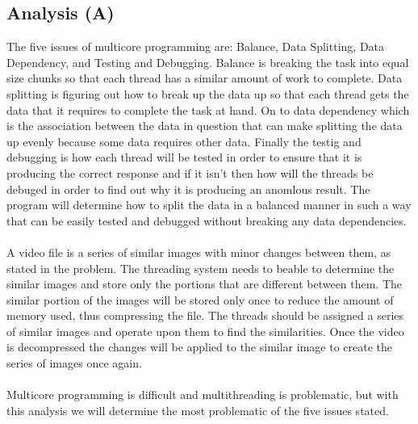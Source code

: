 \documentclass[12pt]{article}
\begin{document}
        \subsection{Analysis (A)}
        The five issues of multicore programming are: Balance, Data Splitting, Data Dependency, and Testing and Debugging. Balance is breaking the task into 
        equal size chunks so that each thread has a similar amount of work to complete. Data splitting is figuring out how to break up the data up so that each
        thread gets the data that it requires to complete the task at hand. On to data dependency which is the association between the data in question that can
        make splitting the data up evenly because some data requires other data. Finally the testig and debugging is how each thread will be tested in order to
        ensure that it is producing the correct response and if it isn't then how will the threads be debuged in order to find out why it is producing an anomlous 
        result. The program will determine how to split the data in a balanced manner in such a way that can be easily tested and debugged without breaking any data
        dependencies.\\
        \\
        A video file is a series of similar images with minor changes between them, as stated in the problem. The threading system needs to beable to determine the
        similar images and store only the portions that are different between them. The similar portion of the images will be stored only once to reduce the amount 
        of memory used, thus compressing the file. The threads should be assigned a series of similar images and operate upon them to find the similarities. Once the
        video is decompressed the changes will be applied to the similar image to create the series of images once again. \\
        \\
        Multicore programming is difficult and multithreading is problematic, but with this analysis we will determine the most problematic of the five issues stated. \\
        \\
\end{document}
